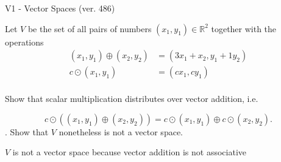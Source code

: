 \begin{exercise}
  \begin{exerciseTitle}V1 - Vector Spaces (ver. 486)\end{exerciseTitle}
  \begin{exerciseStatement}
    Let \(V\) be the set of all pairs of numbers \((x_1,y_1)\in\mathbb{R}^2\)  together with the operations 
\begin{align*}
(x_1,y_1)\oplus (x_2,y_2)&= (3x_1+x_2, y_1+1y_2)\\ 
c \odot (x_1,y_1) &= (cx_1,cy_1)\\ 
\end{align*}

	Show that scalar multiplication distributes over vector addition, i.e. 
					
\[c\odot \left((x_1,y_1)\oplus(x_2,y_2)\right)=c\odot(x_1,y_1)\oplus c\odot(x_2,y_2).\]
.
	Show that \(V\) nonetheless is not a vector space.
	


  \end{exerciseStatement}
  \begin{exerciseAnswer}
   \(V\) is not a vector space because vector addition is not associative
	
  


  \end{exerciseAnswer}
\end{exercise}